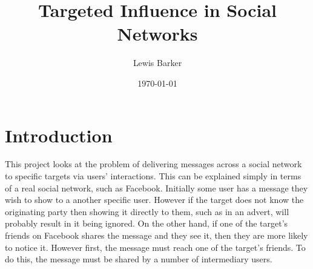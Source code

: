 \documentclass[bsc,frontabs,twoside,singlespacing,parskip,deptreport]{infthesis}     %
\begin{document}
\title{Targeted Influence in Social Networks}

\author{Lewis Barker}



\date{\today}

\abstract{

}

\maketitle

\tableofcontents



\chapter{Introduction}

This project looks at the problem of delivering messages across a social network to specific targets via users' interactions. This can be explained simply in terms of a real social network, such as Facebook. Initially some user has a message they wish to show to a another specific user. However if the target does not know the originating party  then showing it directly to them, such as in an advert, will probably result in it being ignored. On the other hand, if one of the target's friends on Facebook shares the message and they see it, then they are more likely to notice it. However first, the message must reach one of the target's friends. To do this, the message must be shared by a number of intermediary users.
\end{document}
